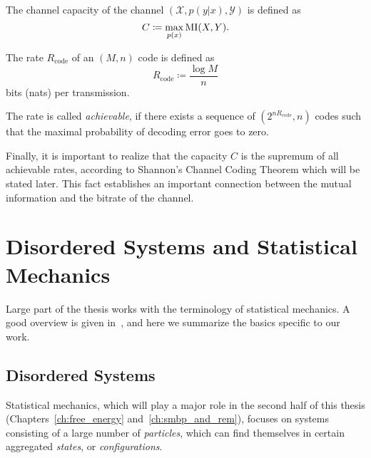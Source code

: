 \begin{definition} \label{def:inf_theor_channel_capacity}
  The channel capacity of the channel $(\mathcal{X}, p(y \vert x), \mathcal{Y})$
  is defined as
  \begin{equation}
    C \coloneqq \max_{p(x)} \mathrm{MI}(X, Y).
  \end{equation}
\end{definition}

\begin{definition} \label{def:inf_theor_code_rate}
  The rate $R_\mathrm{code}$ of an $(M, n)$ code is defined as
  \begin{equation}
    R_\mathrm{code} \coloneqq \frac{\log M}{n}
  \end{equation}
  bits (nats) per transmission.
\end{definition}

The rate is called \textit{achievable}, if there exists a sequence of
$(2^{nR_\text{code}}, n)$ codes such that the maximal probability of decoding
error goes to zero. 

Finally, it is important to realize that the capacity $C$ is the supremum of
all achievable rates, according to Shannon's Channel Coding Theorem which will be 
stated later. This fact establishes an important connection between the mutual information
and the bitrate  of the channel.

\section{Disordered Systems and Statistical Mechanics}

Large part of the thesis works with the terminology of statistical mechanics. 
A good overview is given in~\citep{bovier2012statistical}, and here we summarize
the basics specific to our work.

\subsection{Disordered Systems}
\label{sec:background_disordered_systems}

Statistical mechanics, which will play a major role in the second half of this
thesis (Chapters~\ref{ch:free_energy} and~\ref{ch:smbp_and_rem}), focuses on
systems consisting of a large number of \textit{particles}, which can find
themselves in certain aggregated \textit{states}, or \textit{configurations}.

